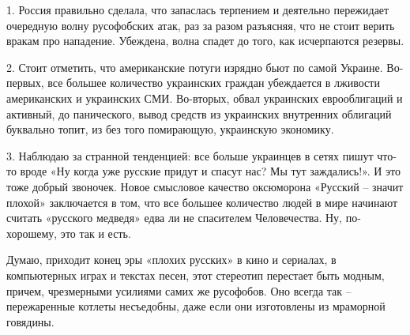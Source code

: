 1. Россия правильно сделала, что запаслась терпением и деятельно пережидает
очередную волну русофобских атак, раз за разом разъясняя, что не стоит верить
вракам про нападение. Убеждена, волна спадет до того, как исчерпаются резервы.

2. Стоит отметить, что американские потуги изрядно бьют по самой Украине.
Во-первых, все большее количество украинских граждан убеждается в лживости
американских и украинских СМИ. Во-вторых, обвал украинских еврооблигаций и
активный, до панического, вывод средств из украинских внутренних облигаций
буквально топит, из без того помирающую, украинскую экономику.

3. Наблюдаю за странной тенденцией: все больше украинцев в сетях пишут что-то
вроде «Ну когда уже русские придут и спасут нас? Мы тут заждались!». И это тоже
добрый звоночек. Новое смысловое качество оксюморона «Русский – значит плохой»
заключается в том, что все большее количество людей в мире начинают считать
«русского медведя» едва ли не спасителем Человечества. Ну, по-хорошему, это так
и есть.

Думаю, приходит конец эры «плохих русских» в кино и сериалах, в компьютерных
играх и текстах песен, этот стереотип перестает быть модным, причем,
чрезмерными усилиями самих же русофобов. Оно всегда так – пережаренные котлеты
несъедобны, даже если они изготовлены из мраморной говядины.
